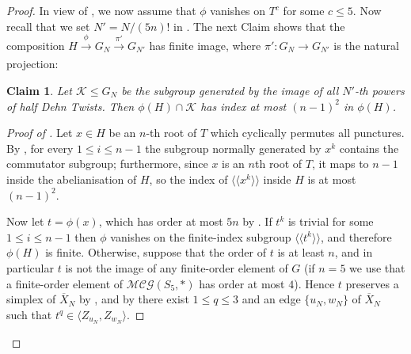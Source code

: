 \documentclass[svgnames]{amsart}
\theoremstyle{plain}
\newtheorem{claim}[thm]{Claim}
\newenvironment{claimproof}{\renewcommand{\qedsymbol}{$\blacksquare$}\begin{proof}}{\end{proof}}
\theoremstyle{definition}
\newcommand{\link}[2]{\operatorname{Link}_{#1}\left(#2\right)}
\newcommand{\MCG}{\mathcal{MCG}}
\newcommand{\ov}[1]{\overline{#1}}
\begin{document}
\begin{proof}
    In view of , we now assume that $\phi$ vanishes on $T^c$ for some $c\le 5$. Now recall that we set $N'=N/(5n)!$ in . The next Claim shows that the composition $H\xrightarrow[]{\phi} G_N\xrightarrow[]{\pi'}G_{N'}$ has finite image, where $\pi'\colon G_N\to G_{N'}$ is the natural projection:

    \begin{claim}\label{claim:phi_cap_pi'}
        Let $\mathcal K\le G_N$ be the subgroup generated by the image of all $N'$-th powers of half Dehn Twists. Then $\phi(H)\cap \mathcal K$ has index at most $(n-1)^2$ in $\phi(H)$.
    \end{claim}

    \begin{claimproof}[Proof of ] Let $x\in H$ be an $n$-th root of $T$ which cyclically permutes all punctures. By \cite[Lemma 6.2]{ChenKordekMargalit}, for every $1\le i\le n-1$ the subgroup normally generated by $x^k$ contains the commutator subgroup; furthermore, since $x$ is an $n$th root of $T$, it maps to $n-1$ inside the abelianisation of $H$, so the index of $\langle\langle x^k\rangle\rangle$ inside $H$ is at most $(n-1)^2$.
    
    
    Now let $t=\phi(x)$, which has order at most $5n$ by . If $t^k$ is trivial for some $1\le i\le n-1$ then $\phi$ vanishes on the finite-index subgroup $\langle \langle t^k\rangle\rangle$, and therefore $\phi(H)$ is finite. Otherwise, suppose that the order of $t$ is at least $n$, and in particular $t$ is not the image of any finite-order element of $G$ (if $n=5$ we use that a finite-order element of $\MCG(S_5,*)$ has order at most $4$). Hence $t$ preserves a simplex of $\ov X_N$ by , and by  there exist $1\le q\le 3$ and an edge $\{u_N,w_N\}$ of $\ov X_N$ such that $t^q\in \langle Z_{u_N},Z_{w_N}\rangle$.

    

\end{claimproof}
\end{proof}
\end{document}
